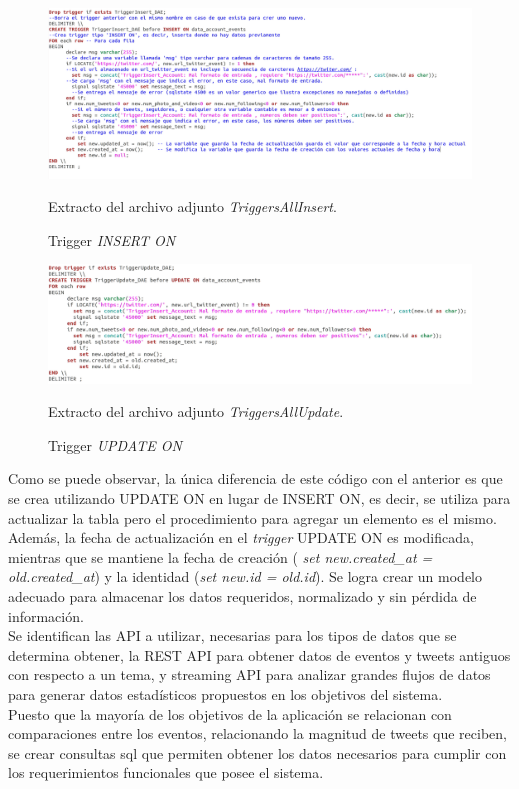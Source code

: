 \documentclass{memoria}
\begin{document}
\begin{figure}[!ht]
\begin{center}
\includegraphics[width=1.2\textwidth]{img/triggerinsert.png}
\caption{Trigger \textit{INSERT ON}}
Extracto del archivo adjunto \textit{TriggersAllInsert}.
\end{center}
\end{figure}
\newpage
\begin{figure}[!ht]
\begin{center}
\includegraphics[width=1\textwidth]{img/triggerupdate.png}
\caption{Trigger \textit{UPDATE ON}}
Extracto del archivo adjunto \textit{TriggersAllUpdate}.
\end{center}
\end{figure}
Como se puede observar, la única diferencia de este código con el anterior es que se crea utilizando UPDATE ON en lugar de INSERT ON, es decir, se utiliza para actualizar la tabla pero el procedimiento para agregar un elemento es el mismo. Además, la fecha de actualización en el \textit{trigger} UPDATE ON es modificada, mientras que se mantiene la fecha de creación (\textit{ set new.created\_at = old.created\_at}) y la identidad (\textit{set new.id = old.id}). 
Se logra crear un modelo adecuado para almacenar los datos requeridos, normalizado y sin pérdida de información.\\
Se identifican las API a utilizar, necesarias para los tipos de datos que se determina obtener, la REST API para obtener datos de eventos y tweets antiguos con respecto a un tema, y streaming API para analizar grandes flujos de datos para generar datos estadísticos propuestos en los objetivos del sistema.\\
Puesto que la mayoría de los objetivos de la aplicación se relacionan con comparaciones entre los eventos, relacionando la magnitud de tweets que reciben, se crear consultas sql que permiten obtener los datos necesarios para cumplir con los requerimientos funcionales que posee el sistema.\\ 
\end{document}
